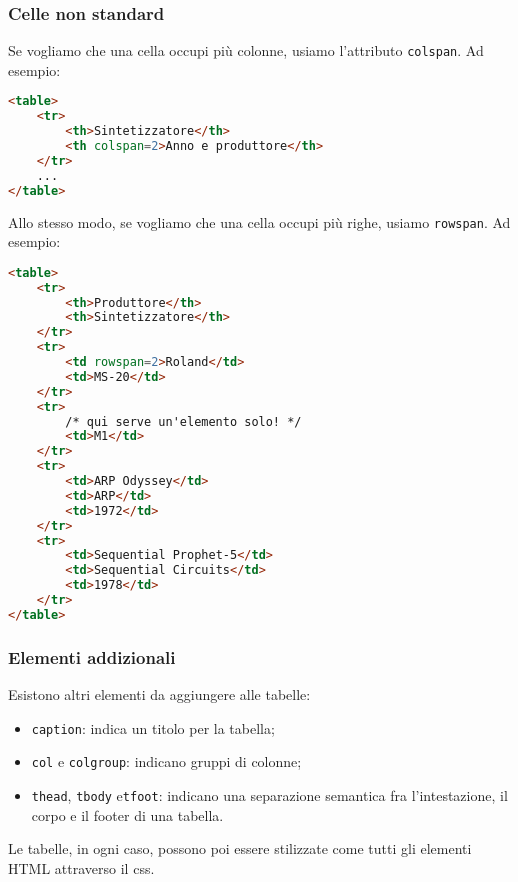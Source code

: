 \documentclass[a4paper,11pt]{article}
\begin{document}
\subsubsection{Celle non standard}
Se vogliamo che una cella occupi più colonne, usiamo l'attributo \lstinline|colspan|.
Ad esempio:
\begin{lstlisting}[language=html, style=codestyle]	
<table>
	<tr>
		<th>Sintetizzatore</th>
		<th colspan=2>Anno e produttore</th>
	</tr>
	...
</table>
\end{lstlisting}

Allo stesso modo, se vogliamo che una cella occupi più righe, usiamo \lstinline|rowspan|.
Ad esempio:

\begin{lstlisting}[language=html, style=codestyle]	
<table>
	<tr>
		<th>Produttore</th>
		<th>Sintetizzatore</th>
	</tr>
	<tr>
		<td rowspan=2>Roland</td>
		<td>MS-20</td>
	</tr>
	<tr>
		/* qui serve un'elemento solo! */
		<td>M1</td>
	</tr>
	<tr>
		<td>ARP Odyssey</td>
		<td>ARP</td>
		<td>1972</td>
	</tr>
	<tr>
		<td>Sequential Prophet-5</td>
		<td>Sequential Circuits</td>
		<td>1978</td>
	</tr>
</table>
\end{lstlisting}

\subsubsection{Elementi addizionali}
Esistono altri elementi da aggiungere alle tabelle:
\begin{itemize}
	\item \lstinline|caption|: indica un titolo per la tabella;
	\item \lstinline|col| e \lstinline|colgroup|: indicano gruppi di colonne;
	\item \lstinline|thead|, \lstinline|tbody| e\lstinline|tfoot|: indicano una separazione semantica fra l'intestazione, il corpo e il footer di una tabella.
\end{itemize}

Le tabelle, in ogni caso, possono poi essere stilizzate come tutti gli elementi HTML attraverso il css.
\end{document}
